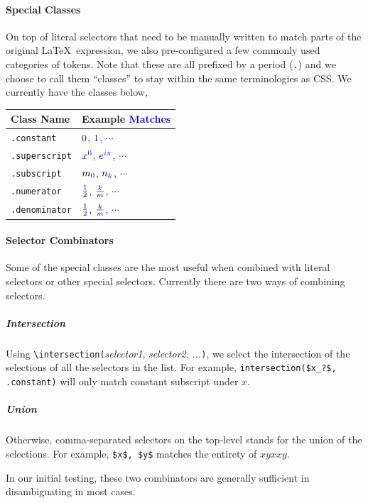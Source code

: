 \documentclass{article}
\begin{document}
\begin{multicols*}{2}
  \paragraph*{Special Classes} On top of literal selectors that need to be manually
  written to match parts of the original \LaTeX\ expression, we also pre-configured
  a few commonly used categories of tokens. Note that these are all prefixed by a
  period (\texttt{.}) and we choose to call them ``classes'' to stay within the same
  terminologies as CSS. We currently have the classes below, \\[1ex]
  \begin{tabularx}{\columnwidth}{l|X}
    \textbf{Class Name}   & \textbf{Example \textcolor{blue}{Matches}}                                 \\\hline
    \texttt{.constant}    & $\textcolor{blue}{0}$, $\textcolor{blue}{1}$, $\cdots$                     \\[2pt]
    \texttt{.superscript} & $x^{\textcolor{blue}{0}}$, $e^{\textcolor{blue}{i\pi}}$, $\cdots$          \\[2pt]
    \texttt{.subscript}   & $m_{\textcolor{blue}{0}}$, $n_{\textcolor{blue}{k}}$, $\cdots$             \\[2pt]
    \texttt{.numerator}   & $\frac{\textcolor{blue}{1}}{2}$, $\frac{\textcolor{blue}{k}}{m}$, $\cdots$ \\[2pt]
    \texttt{.denominator} & $\frac{1}{\textcolor{blue}{2}}$, $\frac{k}{\textcolor{blue}{m}}$, $\cdots$ \\
  \end{tabularx}
  \paragraph*{Selector Combinators}
  Some of the special classes are the most useful when combined with literal selectors
  or other special selectors. Currently there are two ways of combining selectors.
  \subparagraph*{Intersection}
  Using \texttt{\textbackslash{intersection}(}{\textit{selector1}, \textit{selector2}, \textit{...}}{\texttt{)}},
  we select the intersection of the selections of all the selectors in the list.
  For example, \texttt{intersection(\$x\_?\$, .constant)} will only match constant
  subscript under $x$.
  \subparagraph*{Union}
  Otherwise, comma-separated selectors on the top-level stands for the union of the
  selections. For example, \texttt{\$x\$, \$y\$} matches the entirety of $xyxxy$.
  \\\par
  In our initial testing, these two combinators are generally sufficient in
  disambiguating in most cases.

\end{multicols*}
\end{document}

